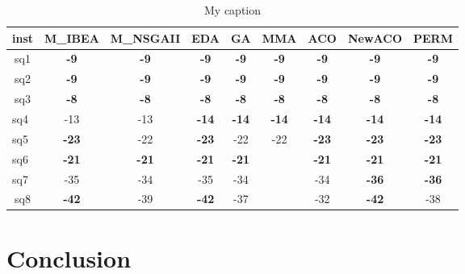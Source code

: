 \begin{table}[]
	\centering
	\caption{My caption}
	\label{my-label}
	\begin{tabular}{ccccccccc}
		\hline
		inst                    & M\_IBEA      & M\_NSGAII    & EDA          & GA           & MMA          & ACO          & NewACO       & PERM         \\ \hline
		sq1                     & \textbf{-9}  & \textbf{-9}  & \textbf{-9}  & \textbf{-9}  & \textbf{-9}  & \textbf{-9}  & \textbf{-9}  & \textbf{-9}  \\ \hline
		sq2                     & \textbf{-9}  & \textbf{-9}  & \textbf{-9}  & \textbf{-9}  & \textbf{-9}  & \textbf{-9}  & \textbf{-9}  & \textbf{-9}  \\ \hline
		sq3                     & \textbf{-8}  & \textbf{-8}  & \textbf{-8}  & \textbf{-8}  & \textbf{-8}  & \textbf{-8}  & \textbf{-8}  & \textbf{-8}  \\ \hline
		\multicolumn{1}{l}{sq4} & -13          & -13          & \textbf{-14} & \textbf{-14} & \textbf{-14} & \textbf{-14} & \textbf{-14} & \textbf{-14} \\ \hline
		\multicolumn{1}{l}{sq5} & \textbf{-23} & -22          & \textbf{-23} & -22          & -22          & \textbf{-23} & \textbf{-23} & \textbf{-23} \\ \hline
		\multicolumn{1}{l}{sq6} & \textbf{-21} & \textbf{-21} & \textbf{-21} & \textbf{-21} &              & \textbf{-21} & \textbf{-21} & \textbf{-21} \\ \hline
		\multicolumn{1}{l}{sq7} & -35          & -34          & -35          & -34          &              & -34          & \textbf{-36} & \textbf{-36} \\ \hline
		sq8                     & \textbf{-42} & -39          & \textbf{-42} & -37          &              & -32          & \textbf{-42} & -38          \\ \hline
	\end{tabular}
\end{table}
	
\section{Conclusion}